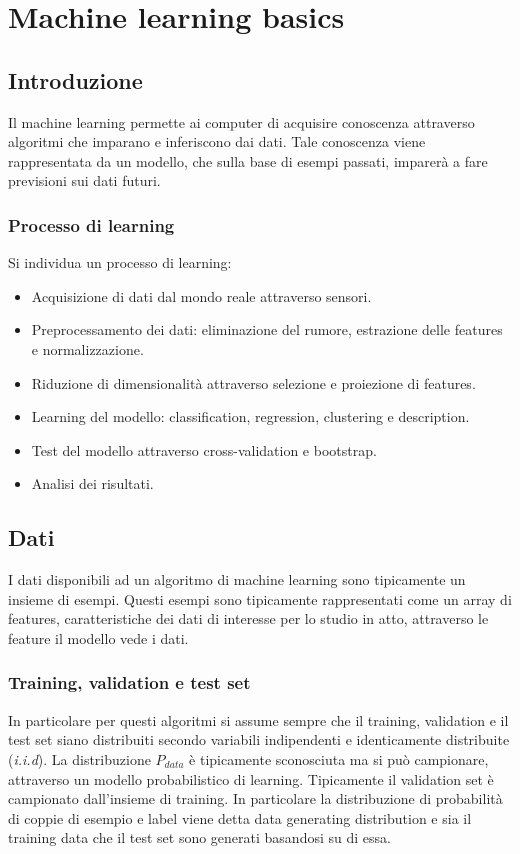 \chapter{Machine learning basics}

\section{Introduzione}
Il machine learning permette ai computer di acquisire conoscenza attraverso algoritmi che imparano e inferiscono dai dati.
Tale conoscenza viene rappresentata da un modello, che sulla base di esempi passati, imparerà a fare previsioni sui dati futuri.

	\subsection{Processo di learning}
	Si individua un processo di learning:
	\begin{multicols}{2}
		\begin{itemize}
			\item Acquisizione di dati dal mondo reale attraverso sensori.
			\item Preprocessamento dei dati: eliminazione del rumore, estrazione delle features e normalizzazione.
			\item Riduzione di dimensionalit\`a attraverso selezione e proiezione di features.
			\item Learning del modello: classification, regression, clustering e description.
			\item Test del modello attraverso cross-validation e bootstrap.
			\item Analisi dei risultati.
		\end{itemize}
	\end{multicols}

\section{Dati}
I dati disponibili ad un algoritmo di machine learning sono tipicamente un insieme di esempi.
Questi esempi sono tipicamente rappresentati come un array di features, caratteristiche dei dati di interesse per lo studio in atto, attraverso le feature il modello vede i dati.

	\subsection{Training, validation e test set}
	In particolare per questi algoritmi si assume sempre che il training, validation e il test set siano distribuiti secondo variabili indipendenti e identicamente distribuite (\emph{i.i.d}).
	La distribuzione $P_{data}$ \`e tipicamente sconosciuta ma si pu\`o campionare, attraverso un modello probabilistico di learning. Tipicamente il validation set \`e campionato dall'insieme di training.
	In particolare la distribuzione di probabilit\`a di coppie di esempio e label viene detta data generating distribution e sia il training data che il test set sono generati basandosi su di essa.
	
